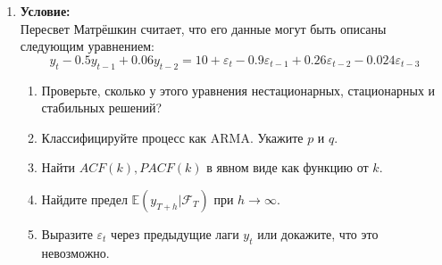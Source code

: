 \documentclass[10pt]{article}
\begin{document}
\begin{enumerate}
\begin{enumerate}[label=(\arabic*)]
    \item При $p>0$ необходимо $q=\frac{1}{2}$, оценим дисперсию и ковариацию. \\
    $\mathbb{V}ar X_t = \mathbb{E}X_t^2 - (\mathbb{E}X_t)^2 = \mathbb{E}A_t^2(-1)^{2S_t} = \mathbb{E}A_t^2 = 0\cdot(1 - p) + 1\cdot p = p$ \\
    $cov(X_t, X_s) = \{\text{t>s}\} = \mathbb{E}(X_t - \mathbb{E}X_t)(X_s - \mathbb{E}X_s) = \mathbb{E}X_tX_s = \mathbb{E}A_tA_s\cdot(-1)^{S_t + S_s}=
    \mathbb{E}A_t\cdot\mathbb{E}A_s\cdot\mathbb{E}(-1)^{\sum\limits_{i=1}^{t-1} B_i + \sum\limits_{j=1}^{s-1} B_j}=
    p^2\cdot\mathbb{E}(-1)^{2\sum\limits_{i=1}^{s-1} B_i + \sum\limits_{j=s}^{t-1} B_j} = p^2\mathbb{E}(-1)^{\sum\limits_{j=s}^{t-1} B_j} =
    p^2\cdot\prod\limits_{j=s}^{t-1}\mathbb{E}(-1)^{B_j} = p^2\cdot(1-2q)^{t-s} = 0$ при $q=\frac{1}{2}, t>s$.\\
    Значит, $p\in(0, 1], q=\frac{1}{2}$ удовлетворяет условиям белого шума.
\end{enumerate}

\textbf{Замечание:} с учётом дословного следования текущему условию вариант $p>0$ не может быть решением, так как $X_1 = A_1\cdot(-1)^{\sum\limits_{k=1}^{0} B_k} = A_1\cdot(-1)^0 = A_1$, откуда
$\mathbb{E}A_1 = p > 0$; однако это небольшая некорректность и правильнее полагать $S_t = \sum\limits_{k=1}^{t} B_k$. \\

\item \textbf{Условие:} \\

Пересвет Матрёшкин считает, что его данные могут быть описаны следующим уравнением:
$$y_t - 0.5y_{t-1} + 0.06y_{t-2} = 10 + \varepsilon_t - 0.9\varepsilon_{t-1} + 0.26\varepsilon_{t-2} - 0.024\varepsilon_{t-3}$$
\begin{enumerate}
    \item Проверьте, сколько у этого уравнения нестационарных, стационарных и стабильных решений?
    \item Классифицируйте процесс как ARMA. Укажите $p$ и $q$.
    \item Найти $ACF(k), PACF(k)$ в явном виде как функцию от $k$.
    \item Найдите предел $\mathbb{E}(y_{T+h}|\mathcal{F}_T)$ при $h\rightarrow\infty$.
    \item Выразите $\varepsilon_t$ через предыдущие лаги $y_t$ или докажите, что это невозможно.
\end{enumerate}


\end{enumerate}
\end{document}
